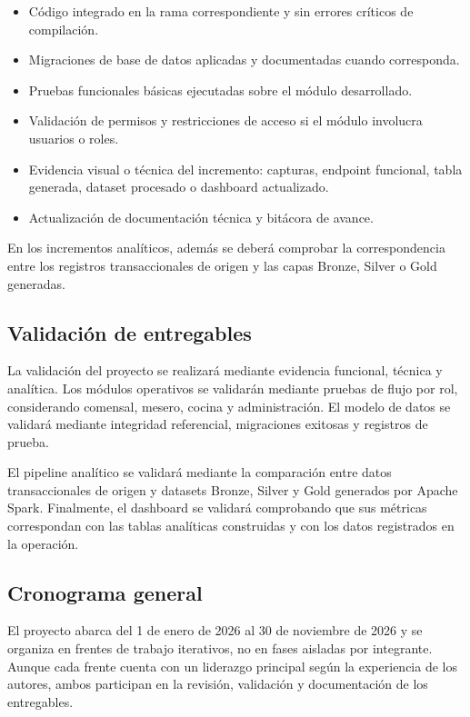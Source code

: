 \begin{itemize}[leftmargin=1.5em]
  \item Código integrado en la rama correspondiente y sin errores críticos de compilación.
  \item Migraciones de base de datos aplicadas y documentadas cuando corresponda.
  \item Pruebas funcionales básicas ejecutadas sobre el módulo desarrollado.
  \item Validación de permisos y restricciones de acceso si el módulo involucra usuarios o roles.
  \item Evidencia visual o técnica del incremento: capturas, endpoint funcional, tabla generada,
  dataset procesado o dashboard actualizado.
  \item Actualización de documentación técnica y bitácora de avance.
\end{itemize}

En los incrementos analíticos, además se deberá comprobar la correspondencia entre los
registros transaccionales de origen y las capas Bronze, Silver o Gold generadas.

\subsection{Validación de entregables}

La validación del proyecto se realizará mediante evidencia funcional, técnica y analítica.
Los módulos operativos se validarán mediante pruebas de flujo por rol, considerando
comensal, mesero, cocina y administración. El modelo de datos se validará mediante
integridad referencial, migraciones exitosas y registros de prueba.

El pipeline analítico se validará mediante la comparación entre datos transaccionales de
origen y datasets Bronze, Silver y Gold generados por Apache Spark. Finalmente, el dashboard
se validará comprobando que sus métricas correspondan con las tablas analíticas construidas
y con los datos registrados en la operación.


\subsection{Cronograma general}

El proyecto abarca del 1 de enero de 2026 al 30 de noviembre de 2026 y se organiza
en frentes de trabajo iterativos, no en fases aisladas por integrante. Aunque cada
frente cuenta con un liderazgo principal según la experiencia de los autores, ambos
participan en la revisión, validación y documentación de los entregables.

